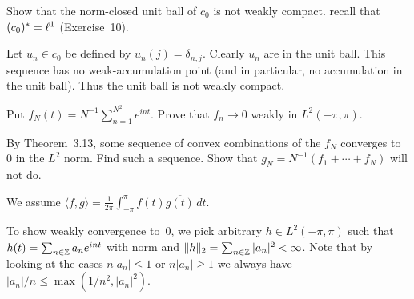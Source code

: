\begin{enumerate}
\begin{excopy}
Show that the norm-closed unit ball of \(c_0\) is not weakly compact.
recall that \((c_0)^* = \ell^1\) (Exercise~10).
\end{excopy}

Let \(u_n\in c_0\) be defined by \(u_n(j) = \delta_{n,j}\).
Clearly  \(u_n\) are in the unit ball. This sequence
has no weak-accumulation point
(and in particular, no accumulation in the unit ball). Thus the unit ball
is not weakly compact.

\begin{excopy}
Put \(f_N(t) = N^{-1} \sum_{n=1}^{N^2} e^{int}\). Prove that \(f_n\to 0\) weakly
in \(L^2(-\pi,\pi)\).

By Theorem~3.13, some sequence of convex combinations of the \(f_N\)
converges to $0$ in the \(L^2\) norm.
Find such a sequence.
Show that \(g_N = N^{-1}(f_1 + \cdots + f_N)\) will not do.
\end{excopy}

\iffalse
We first solve the following
(similar Exercise~7 of Chapter~3 in \cite{RudinPMA85})

\begin{llem}
If \(\sum_{n=1}^\infty a_n^2 < \infty\) where \(a_n \geq 0\)
then the series \sum_{n=1}^\infty a_n/n\) converges.
\end{llem}
\begin{proof}
\Wlogy\ we assume \(a_n \geq 0\).
Using the root ratio test (Theorem~3.33 in \cite{RudinPMA85}.
\begin{align*}
\limsup_{n\to\infty} \sqrt[n]{a_n/n}
=       \left(\limsup_{n\to\infty} \sqrt[n]{a_n}\right)
  \cdot \left(\lim_{n\to\infty} \sqrt[n]{1/n}\right) \\
&= \limsup_{n\to\infty} \sqrt[n]{a_n}
\end{align*}
\end{proof}
\fi

We assume
 \(\langle f,g \rangle = \frac{1}{2\pi}\int_{-\pi}^\pi f(t)\overline{g(t)}\,dt\).

To show weakly convergence to~0, we pick arbitrary \(h\in L^2(-\pi,\pi)\)
such that \(h(t) = \sum_{n\in\mathbb{Z}} a_n e^{int}\)
with norm  and \(\|h\|_2 = \sum_{n\in\mathbb{Z}} |a_n|^2 < \infty\).
Note that by looking at the cases
\(n|a_n| \leq 1\) or \(n|a_n| \geq 1\) we always have
\(|a_n|/n \leq \max(1/n^2, |a_n|^2)\).


\iffalse
Using the root ratio test (Theorem~3.33 in \cite{RudinPMA85}
we know that
\begin{equation*}
\limsup_{n\to\infty} \sqrt[n]{|a_n|^2} < 1.
\end{equation*}
\fi


\end{enumerate}
